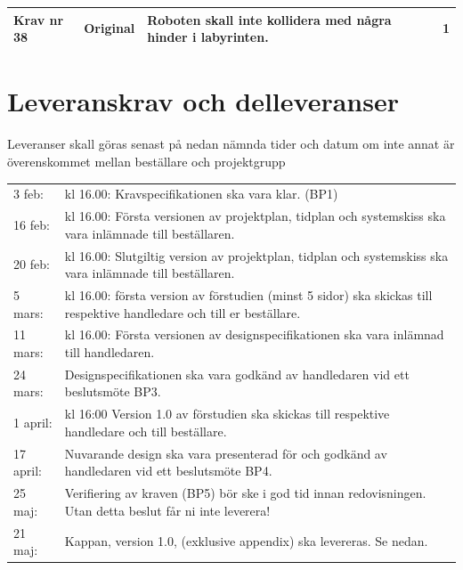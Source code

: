 \documentclass[11pt]{article}
\begin{document}
\begin{flushleft}
\begin{center}
\begin{longtable}{|l|l|p{.70\linewidth}|l|}
Krav nr 38 &
Original &
Roboten skall inte kollidera med några hinder i labyrinten. &
1 \\ \hline

\end{longtable}
\end{center}

\pagebreak
\section{Leveranskrav och delleveranser}
Leveranser skall göras senast på nedan nämnda tider och datum om inte annat är överenskommet mellan beställare och projektgrupp
\begin{center}
\begin{longtable}{l p{.8\linewidth} }

3 feb: & 
kl 16.00: Kravspecifikationen ska vara klar. (BP1) \\

16 feb: & 
kl 16.00: Första versionen av projektplan, tidplan och systemskiss ska vara inlämnade till beställaren. \\

20 feb: & 
kl 16.00: Slutgiltig version av projektplan, tidplan och systemskiss ska vara inlämnade till beställaren. \\

5 mars: &
kl 16.00: första version av förstudien (minst 5 sidor) ska skickas till respektive handledare och till er beställare. \\

11 mars: & 
kl 16.00: Första versionen av designspecifikationen ska vara inlämnad till handledaren. \\

24 mars: &
Designspecifikationen ska vara godkänd av handledaren vid ett beslutsmöte BP3. \\

1 april: &
kl 16:00 Version 1.0 av förstudien ska skickas till respektive handledare och till beställare. \\

17 april: & 
Nuvarande design ska vara presenterad för och godkänd av handledaren vid ett beslutsmöte BP4. \\

25 maj: &
Verifiering av kraven (BP5) bör ske i god tid innan redovisningen. Utan detta beslut får ni inte leverera! \\

21 maj: &
Kappan, version 1.0, (exklusive appendix) ska levereras. Se nedan. \\


\end{longtable}
\end{center}
\end{flushleft}
\end{document}
